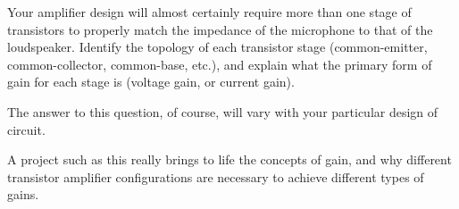 

Your amplifier design will almost certainly require more than one stage of transistors to properly match the impedance of the microphone to that of the loudspeaker.  Identify the topology of each transistor stage (common-emitter, common-collector, common-base, etc.), and explain what the primary form of gain for each stage is (voltage gain, or current gain).







The answer to this question, of course, will vary with your particular design of circuit.







A project such as this really brings to life the concepts of gain, and why different transistor amplifier configurations are necessary to achieve different types of gains.




